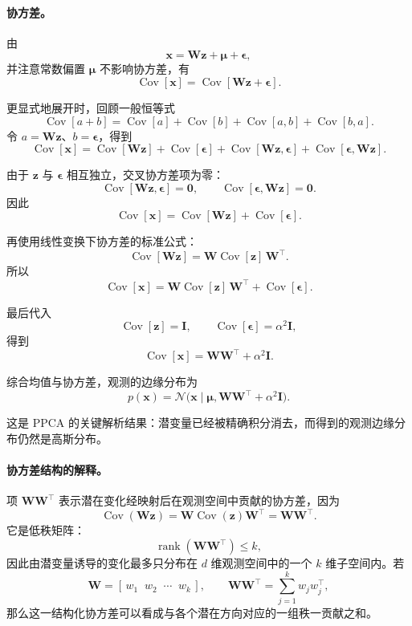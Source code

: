 \paragraph{协方差。}
由
\[
\mathbf{x}=\mathbf{W}\mathbf{z}+\boldsymbol{\mu}+\boldsymbol{\epsilon},
\]
并注意常数偏置 \(\boldsymbol{\mu}\) 不影响协方差，有
\[
\operatorname{Cov}[\mathbf{x}]
=
\operatorname{Cov}[\mathbf{W}\mathbf{z}+\boldsymbol{\epsilon}].
\]

更显式地展开时，回顾一般恒等式
\[
\operatorname{Cov}[a+b]
=
\operatorname{Cov}[a]
+
\operatorname{Cov}[b]
+
\operatorname{Cov}[a,b]
+
\operatorname{Cov}[b,a].
\]
令 \(a=\mathbf{W}\mathbf{z}\)、\(b=\boldsymbol{\epsilon}\)，得到
\[
\operatorname{Cov}[\mathbf{x}]
=
\operatorname{Cov}[\mathbf{W}\mathbf{z}]
+
\operatorname{Cov}[\boldsymbol{\epsilon}]
+
\operatorname{Cov}[\mathbf{W}\mathbf{z},\boldsymbol{\epsilon}]
+
\operatorname{Cov}[\boldsymbol{\epsilon},\mathbf{W}\mathbf{z}].
\]

由于 \(\mathbf{z}\) 与 \(\boldsymbol{\epsilon}\) 相互独立，交叉协方差项为零：
\[
\operatorname{Cov}[\mathbf{W}\mathbf{z},\boldsymbol{\epsilon}]=\mathbf{0},
\qquad
\operatorname{Cov}[\boldsymbol{\epsilon},\mathbf{W}\mathbf{z}]=\mathbf{0}.
\]
因此
\[
\operatorname{Cov}[\mathbf{x}]
=
\operatorname{Cov}[\mathbf{W}\mathbf{z}]
+
\operatorname{Cov}[\boldsymbol{\epsilon}].
\]

再使用线性变换下协方差的标准公式：
\[
\operatorname{Cov}[\mathbf{W}\mathbf{z}]
=
\mathbf{W}\operatorname{Cov}[\mathbf{z}]\,\mathbf{W}^\top.
\]
所以
\[
\operatorname{Cov}[\mathbf{x}]
=
\mathbf{W}\operatorname{Cov}[\mathbf{z}]\,\mathbf{W}^\top
+
\operatorname{Cov}[\boldsymbol{\epsilon}].
\]

最后代入
\[
\operatorname{Cov}[\mathbf{z}]=\mathbf{I},
\qquad
\operatorname{Cov}[\boldsymbol{\epsilon}]=\alpha^2\mathbf{I},
\]
得到
\[
\operatorname{Cov}[\mathbf{x}]
=
\mathbf{W}\mathbf{W}^\top+\alpha^2\mathbf{I}.
\]

综合均值与协方差，观测的边缘分布为
\[
p(\mathbf{x})
=
\mathcal{N}\!\bigl(
\mathbf{x}\mid
\boldsymbol{\mu},
\mathbf{W}\mathbf{W}^\top+\alpha^2\mathbf{I}
\bigr).
\]

这是 PPCA 的关键解析结果：潜变量已经被精确积分消去，而得到的观测边缘分布仍然是高斯分布。

\paragraph{协方差结构的解释。}
项 \(\mathbf{W}\mathbf{W}^\top\) 表示潜在变化经映射后在观测空间中贡献的协方差，因为
\[
\operatorname{Cov}(\mathbf{W}\mathbf{z})
=
\mathbf{W}\operatorname{Cov}(\mathbf{z})\mathbf{W}^\top
=
\mathbf{W}\mathbf{W}^\top.
\]
它是低秩矩阵：
\[
\operatorname{rank}(\mathbf{W}\mathbf{W}^\top)\le k,
\]
因此由潜变量诱导的变化最多只分布在 \(d\) 维观测空间中的一个 \(k\) 维子空间内。若
\[
\mathbf{W}=[\,w_1\;\;w_2\;\;\cdots\;\;w_k\,],
\qquad
\mathbf{W}\mathbf{W}^\top=\sum_{j=1}^k w_jw_j^\top,
\]
那么这一结构化协方差可以看成与各个潜在方向对应的一组秩一贡献之和。

